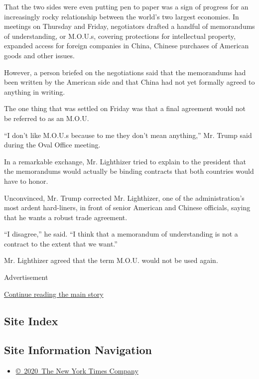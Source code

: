 That the two sides were even putting pen to paper was a sign of progress
for an increasingly rocky relationship between the world's two largest
economies. In meetings on Thursday and Friday, negotiators drafted a
handful of memorandums of understanding, or M.O.U.s, covering
protections for intellectual property, expanded access for foreign
companies in China, Chinese purchases of American goods and other
issues.

However, a person briefed on the negotiations said that the memorandums
had been written by the American side and that China had not yet
formally agreed to anything in writing.

The one thing that was settled on Friday was that a final agreement
would not be referred to as an M.O.U.

``I don't like M.O.U.s because to me they don't mean anything,'' Mr.
Trump said during the Oval Office meeting.

In a remarkable exchange, Mr. Lighthizer tried to explain to the
president that the memorandums would actually be binding contracts that
both countries would have to honor.

Unconvinced, Mr. Trump corrected Mr. Lighthizer, one of the
administration's most ardent hard-liners, in front of senior American
and Chinese officials, saying that he wants a robust trade agreement.

``I disagree,'' he said. ``I think that a memorandum of understanding is
not a contract to the extent that we want.''

Mr. Lighthizer agreed that the term M.O.U. would not be used again.

Advertisement

\protect\hyperlink{after-bottom}{Continue reading the main story}

\hypertarget{site-index}{%
\subsection{Site Index}\label{site-index}}

\hypertarget{site-information-navigation}{%
\subsection{Site Information
Navigation}\label{site-information-navigation}}

\begin{itemize}
\tightlist
\item
  \href{https://help.nytimes.com/hc/en-us/articles/115014792127-Copyright-notice}{©~2020~The
  New York Times Company}
\end{itemize}

